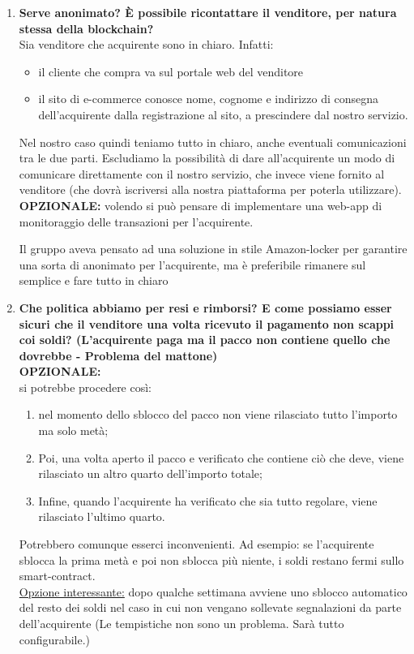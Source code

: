 \documentclass[11pt]{article}
\begin{document}
\begin{enumerate}
				\item \textbf{Serve anonimato? È possibile ricontattare il venditore, per natura stessa della blockchain?}\\
				
				Sia venditore che acquirente sono in chiaro. Infatti:
				\begin{itemize}
					\item il cliente che compra va sul portale web del venditore 
					\item il sito di e-commerce conosce nome, cognome e indirizzo di consegna dell’acquirente dalla registrazione al sito, a prescindere dal nostro servizio.
				\end{itemize}
				
				Nel nostro caso quindi teniamo tutto in chiaro, anche eventuali comunicazioni tra le due parti. Escludiamo la possibilità di dare all’acquirente un modo di comunicare direttamente con il nostro servizio, che invece viene fornito al venditore (che dovrà iscriversi alla nostra piattaforma per poterla utilizzare). \\
				\textbf{OPZIONALE:} volendo si può pensare di implementare una web-app di monitoraggio delle transazioni per l’acquirente.
				
				Il gruppo aveva pensato ad una soluzione in stile Amazon-locker per garantire una sorta di anonimato per l’acquirente, ma è preferibile rimanere sul semplice e fare tutto in chiaro
				
				\item \textbf{Che politica abbiamo per resi e rimborsi? E come possiamo esser sicuri che il venditore una volta ricevuto il pagamento non scappi coi soldi? (L'acquirente paga ma il pacco non contiene quello che dovrebbe - Problema del mattone)} \\
				
				\textbf{OPZIONALE:} \\
				si potrebbe procedere così:
					\begin{enumerate}
						\item nel momento dello sblocco del pacco non viene rilasciato tutto l’importo ma solo metà;
						\item Poi, una volta aperto il pacco e verificato che contiene ciò che deve, viene rilasciato un altro quarto dell’importo totale;
						\item Infine, quando l’acquirente ha verificato che sia tutto regolare, viene rilasciato l’ultimo quarto.
					\end{enumerate}   
				Potrebbero comunque esserci inconvenienti. Ad esempio: se l’acquirente sblocca la prima metà e poi non sblocca più niente, i soldi restano fermi sullo smart-contract. \\
				\underline{Opzione interessante:} dopo qualche settimana avviene uno sblocco automatico del resto dei soldi nel caso in cui non vengano sollevate segnalazioni da parte dell’acquirente (Le tempistiche non sono un problema. Sarà tutto configurabile.)
				

\end{enumerate}
\end{document}

